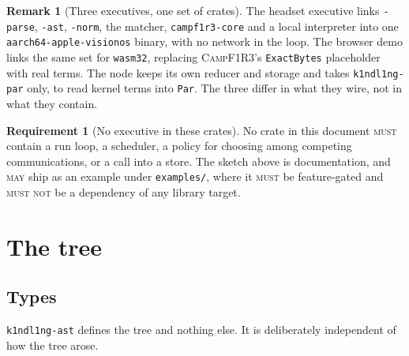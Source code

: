 \documentclass[11pt,a4paper]{article}
\newcommand{\code}[1]{\texttt{#1}}
\newcommand{\Camp}{\textsc{CampF1R3}}
\newcommand{\MUST}{\textsc{must}}
\newcommand{\MUSTNOT}{\textsc{must not}}
\newcommand{\MAY}{\textsc{may}}
\theoremstyle{definition}
\newtheorem{requirement}[definition]{Requirement}
\newtheorem{remark}[definition]{Remark}
\theoremstyle{plain}
\begin{document}
\begin{remark}[Three executives, one set of crates]
The headset executive links \code{-parse}, \code{-ast}, \code{-norm}, the
matcher, \code{campf1r3-core} and a local interpreter into one
\code{aarch64-apple-visionos} binary, with no network in the loop. The browser
demo links the same set for \code{wasm32}, replacing \Camp's \code{ExactBytes}
placeholder with real terms. The node keeps its own reducer and storage and
takes \code{k1ndl1ng-par} only, to read kernel terms into \code{Par}. The three
differ in what they wire, not in what they contain.
\end{remark}

\begin{requirement}[No executive in these crates]
No crate in this document \MUST{} contain a run loop, a scheduler, a policy for
choosing among competing communications, or a call into a store. The sketch
above is documentation, and \MAY{} ship as an example under
\code{examples/}, where it \MUST{} be feature-gated and \MUSTNOT{} be a
dependency of any library target.
\end{requirement}

\section{The tree}\label{sec:ast}

\subsection{Types}

\code{k1ndl1ng-ast} defines the tree and nothing else. It is deliberately
independent of how the tree arose.
\end{document}
